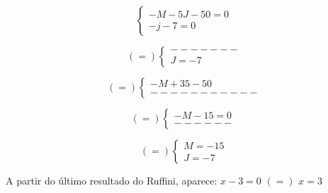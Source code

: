 \documentclass[11pt]{article}
\begin{document}
\begin{minipage}{0.3\textwidth}
	\[\left\{
		\begin{array}{lr}
    		-M-5J-50=0\\
    		-j-7=0
  		\end{array}
	\right.
	\]
\end{minipage}%
\begin{minipage}{0.3\textwidth}
	\[(=)\left\{
		\begin{array}{lr}
    		-------\\
    		J=-7
  		\end{array}
	\right.
	\]					
\end{minipage}
\begin{minipage}{0.3\textwidth}
	\[(=)\left\{
		\begin{array}{lr}
    		-M+35-50\\
    		-----------
  		\end{array}
	\right.
	\]			
\end{minipage}

\begin{minipage}{0.3\textwidth}
	\[(=)\left\{
		\begin{array}{lr}
    		-M-15=0\\
    		------
  		\end{array}
	\right.
	\]
\end{minipage}%
\begin{minipage}{0.3\textwidth}
	\[(=)\left\{
		\begin{array}{lr}
    		M=-15\\
    		J=-7
  		\end{array}
	\right.
	\]					
\end{minipage}

\vspace{5mm}
A partir do último resultado do Ruffini, aparece:
$x-3=0$ \hspace{1mm} $(=)$ \hspace{1mm} $x=3$
\end{document}
